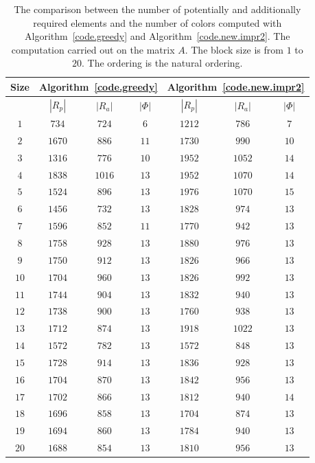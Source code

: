 \documentclass[12pt, twoside,a4paper,toc=bibliography]{scrbook}
\newcommand{\coderef}[1]{Algorithm~\protect\ref{#1}}
\begin{document}
\begin{table}
\centering
\begin{tabular}{|c|c|c|c|c|c|c|}
\hline
Size & \multicolumn{3}{c|}{\coderef{code.greedy}} & \multicolumn{3}{c|}{\coderef{code.new.impr2}}\\\hline
{} & $|R_p|$ & $|R_a|$ & $|\Phi|$ & $|R_p|$ & $|R_a|$ & $|\Phi|$\\\hline
$1$ & $734$ & $724$ & $6$ & $1212$ & $786$ & $7$\\\hline
$2$ & $1670$ & $886$ & $11$ & $1730$ & $990$ & $10$\\\hline
$3$ & $1316$ & $776$ & $10$ & $1952$ & $1052$ & $14$\\\hline
$4$ & $1838$ & $1016$ & $13$ & $1952$ & $1070$ & $14$\\\hline
$5$ & $1524$ & $896$ & $13$ & $1976$ & $1070$ & $15$\\\hline
$6$ & $1456$ & $732$ & $13$ & $1828$ & $974$ & $13$\\\hline
$7$ & $1596$ & $852$ & $11$ & $1770$ & $942$ & $13$\\\hline
$8$ & $1758$ & $928$ & $13$ & $1880$ & $976$ & $13$\\\hline
$9$ & $1750$ & $912$ & $13$ & $1826$ & $966$ & $13$\\\hline
$10$ & $1704$ & $960$ & $13$ & $1826$ & $992$ & $13$\\\hline
$11$ & $1744$ & $904$ & $13$ & $1832$ & $940$ & $13$\\\hline
$12$ & $1738$ & $900$ & $13$ & $1760$ & $938$ & $13$\\\hline
$13$ & $1712$ & $874$ & $13$ & $1918$ & $1022$ & $13$\\\hline
$14$ & $1572$ & $782$ & $13$ & $1572$ & $848$ & $13$\\\hline
$15$ & $1728$ & $914$ & $13$ & $1836$ & $928$ & $13$\\\hline
$16$ & $1704$ & $870$ & $13$ & $1842$ & $956$ & $13$\\\hline
$17$ & $1702$ & $866$ & $13$ & $1812$ & $940$ & $14$\\\hline
$18$ & $1696$ & $858$ & $13$ & $1704$ & $874$ & $13$\\\hline
$19$ & $1694$ & $860$ & $13$ & $1784$ & $940$ & $13$\\\hline
$20$ & $1688$ & $854$ & $13$ & $1810$ & $956$ & $13$\\\hline
\end{tabular}
\caption{The comparison between the number of potentially and additionally required
elements and the number of colors computed with \coderef{code.greedy} and \coderef{code.new.impr2}.
The computation carried out on the matrix $A$.
The block size is from $1$ to $20$. The ordering is the natural ordering.}
\label{bls.greedy.new.carbon}
\end{table}
\end{document}
